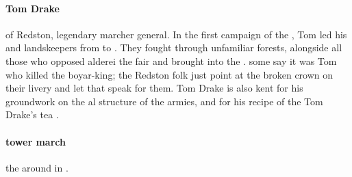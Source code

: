 \paragraph{Tom Drake} of Redston, legendary marcher general. In the first campaign of the , Tom led his  and landskeepers from  to . They fought through unfamiliar forests, alongside all those who opposed alderei the fair and brought  into the . some say it was Tom who killed the boyar-king; the Redston folk just point at the broken crown on their livery and let that speak for them. Tom Drake is also kent for his groundwork on the al structure of the armies, and for his recipe of the Tom Drake's tea .
\paragraph{tower march} the  around  in .
